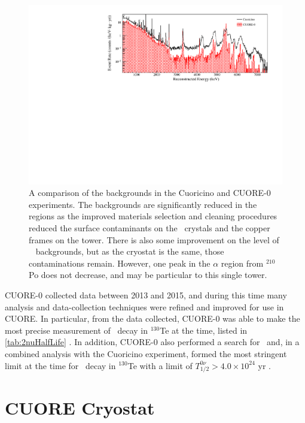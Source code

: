 \begin{figure}[htpb]
    \centering
    \includegraphics[width=\linewidth]{Figures/CUORE-0_vs_Cuoricino.pdf}
    \caption[A comparison of the backgrounds in the Cuoricino and CUORE-0 exeperiments.]
    {A comparison of the backgrounds in the Cuoricino and CUORE-0 experiments.
    The backgrounds are significantly reduced in the \gamma~ regions as the improved materials selection and cleaning procedures reduced the surface contaminants on the \teotwo~crystals and the copper frames on the tower.
    There is also some improvement on the level of \gamma~ backgrounds, but as the cryostat is the same, those contaminations remain.
    However, one peak in the $\alpha$ region from $^{210}$Po does not decrease, and may be particular to this single tower.}
    \label{fig:cuore-0_vs_cuoricino}
\end{figure}

CUORE-0 collected data between 2013 and 2015, and during this time many analysis and data-collection techniques were refined and improved for use in CUORE.
In particular, from the data collected, CUORE-0 was able to make the most precise measurement of \twonubb~decay in $^{130}$Te at the time, listed in \autoref{tab:2nuHalfLife} \cite{Alduino:2016vtd}.
In addition, CUORE-0 also performed a search for \zeronubb~and, in a combined analysis with the Cuoricino experiment, formed the most stringent limit at the time for \zeronubb~decay in $^{130}$Te with a limit of $T^{0ν}_{1/2}>4.0\times10^{24}$ yr \cite{Alfonso:2015wka}.

\section{CUORE Cryostat}
\label{sec:CUORE Cryostat}

